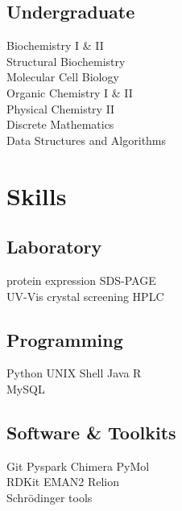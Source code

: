 \documentclass[]{deedy-resume-openfont}
\begin{document}
\begin{minipage}[t]{0.33\textwidth}
\subsection{Undergraduate}
Biochemistry I \& II \\
Structural Biochemistry\\
Molecular Cell Biology \\
Organic Chemistry I \& II \\
Physical Chemistry II \\
Discrete Mathematics \\
Data Structures and Algorithms\\
\sectionsep


\section{Skills}

\subsection{Laboratory}
 \textbullet{} protein expression
 \textbullet{} SDS-PAGE\\
 \textbullet{} UV-Vis
 \textbullet{} crystal screening
 \textbullet{} HPLC\\
\sectionsep

\subsection{Programming}
 \textbullet{} Python
 \textbullet{} UNIX Shell
 \textbullet{} Java
 \textbullet{} R \\
 \textbullet{} MySQL
\sectionsep

\subsection{Software \& Toolkits}
 \textbullet{} Git
 \textbullet{} Pyspark
 \textbullet{} Chimera
 \textbullet{} PyMol\\
 \textbullet{} RDKit
 \textbullet{} EMAN2
 \textbullet{} Relion\\
 \textbullet{} Schrödinger tools
 \\
\sectionsep


\end{minipage}
\end{document}
